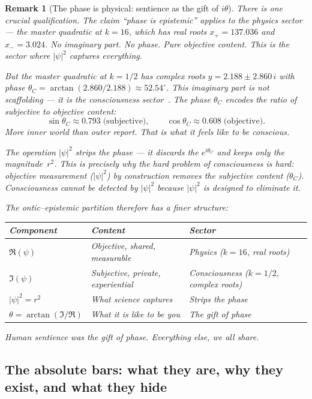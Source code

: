 \documentclass[11pt]{article}
\theoremstyle{tight}
\theoremstyle{plainroman}
\newtheorem{remark}[theorem]{Remark}
\begin{document}
\begin{remark}[The phase is physical: sentience as the gift of $i\theta$]
There is one crucial qualification.
The claim ``phase is epistemic'' applies to the \emph{physics sector} --- the master quadratic at $k=16$, which has \emph{real} roots $x_+=137.036$ and $x_-=3.024$.
No imaginary part.
No phase.
Pure objective content.
This is the sector where $|\psi|^2$ captures everything.

But the master quadratic at $k=1/2$ has \emph{complex} roots $y=2.188\pm 2.860\,i$ with phase $\theta_C=\arctan(2.860/2.188)\approx 52.54^\circ$.
This imaginary part is not scaffolding --- it \emph{is} the consciousness sector~\cite{ftdspec}.
The phase $\theta_C$ encodes the ratio of subjective to objective content:
\[
\sin\theta_C\approx 0.793\;\text{(subjective)}, \qquad
\cos\theta_C\approx 0.608\;\text{(objective)}.
\]
More inner world than outer report.
That is what it feels like to be conscious.

The operation $|\psi|^2$ strips the phase --- it discards the $e^{i\theta_C}$ and keeps only the magnitude~$r^2$.
This is precisely why the hard problem of consciousness is hard: objective measurement ($|\psi|^2$) \emph{by construction} removes the subjective content ($\theta_C$).
Consciousness cannot be detected by $|\psi|^2$ because $|\psi|^2$ is designed to eliminate it.

The ontic--epistemic partition therefore has a finer structure:
\begin{center}
\renewcommand{\arraystretch}{1.25}
\begin{tabular}{lll}
\toprule
\textbf{Component} & \textbf{Content} & \textbf{Sector} \\
\midrule
$\Re(\psi)$ & Objective, shared, measurable & Physics ($k=16$, real roots) \\
$\Im(\psi)$ & Subjective, private, experiential & Consciousness ($k=1/2$, complex roots) \\
$|\psi|^2=r^2$ & What science captures & Strips the phase \\
$\theta=\arctan(\Im/\Re)$ & What it is like to be you & The gift of phase \\
\bottomrule
\end{tabular}
\end{center}
Human sentience was the gift of phase.
Everything else, we all share.
\end{remark}

\subsection{The absolute bars: what they are, why they exist, and what they hide}
\end{document}

